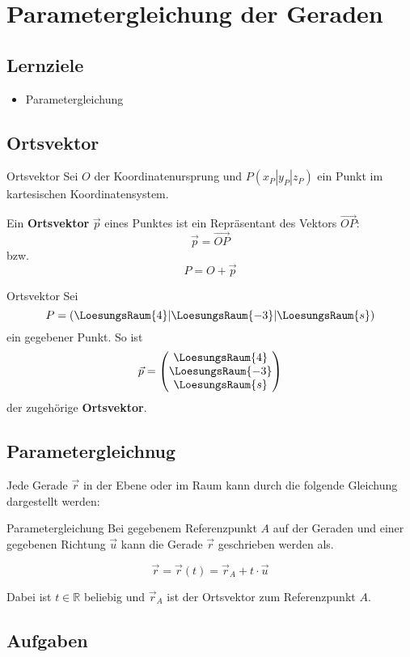 \section{Parametergleichung der Geraden}

\subsection*{Lernziele}
\begin{itemize}
\item Parametergleichung
\end{itemize}

\newpage
\subsection{Ortsvektor}

\begin{definition}{Ortsvektor}{}
  Sei $O$ der Koordinatenursprung und $P(x_P|y_P|z_P)$ ein Punkt im
  kartesischen Koordinatensystem.
  
  Ein \textbf{Ortsvektor} $\vec{p}$ eines Punktes
  ist ein Repräsentant des Vektors $\overrightarrow{OP}$:
  $$\vec{p} = \overrightarrow{OP}$$
  bzw.
  $$P = O + \vec{p}$$
\end{definition}

\begin{beispiel}{Ortsvektor}{}
  Sei
  $$P=(\LoesungsRaum{4}|\LoesungsRaum{-3}|\LoesungsRaum{s})$$
  ein
gegebener Punkt. So ist
 $$\vec{p}
= \begin{pmatrix}\LoesungsRaum{4}\\\LoesungsRaum{-3}\\\LoesungsRaum{s}\end{pmatrix}$$
der zugehörige \textbf{Ortsvektor}.
\end{beispiel}

\newpage
\subsection{Parametergleichnug}
Jede Gerade $\vec{r}$ in der Ebene oder im Raum kann durch die
folgende Gleichung dargestellt werden:

\begin{definition}{Parametergleichung}{}
  Bei gegebenem Referenzpunkt $A$ auf der Geraden und einer gegebenen
  Richtung $\vec{u}$ kann die Gerade $\vec{r}$ geschrieben werden als.
  
  $$\vec{r} = \vec{r}(t) = \vec{r}_A + t\cdot{} \vec{u}$$

  Dabei ist $t\in\mathbb{R}$ beliebig und $\vec{r}_A$ ist der
  Ortsvektor zum Referenzpunkt $A$.
\end{definition}

\subsection*{Aufgaben}
\newpage%
